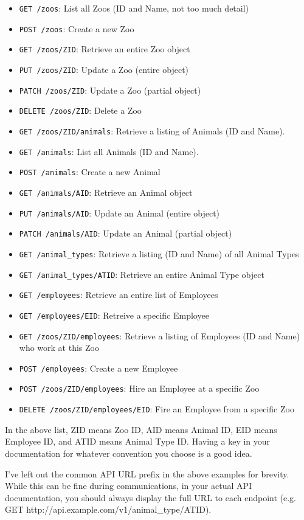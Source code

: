 \documentclass{book}
\begin{document}
\begin{itemize}
\item \texttt{GET /zoos}: List all Zoos (ID and Name, not too much detail)
\item \texttt{POST /zoos}: Create a new Zoo
\item \texttt{GET /zoos/ZID}: Retrieve an entire Zoo object
\item \texttt{PUT /zoos/ZID}: Update a Zoo (entire object)
\item \texttt{PATCH /zoos/ZID}: Update a Zoo (partial object)
\item \texttt{DELETE /zoos/ZID}: Delete a Zoo
\item \texttt{GET /zoos/ZID/animals}: Retrieve a listing of Animals (ID and Name).
\item \texttt{GET /animals}: List all Animals (ID and Name).
\item \texttt{POST /animals}: Create a new Animal
\item \texttt{GET /animals/AID}: Retrieve an Animal object
\item \texttt{PUT /animals/AID}: Update an Animal (entire object)
\item \texttt{PATCH /animals/AID}: Update an Animal (partial object)
\item \texttt{GET /animal\_types}: Retrieve a listing (ID and Name) of all Animal Types
\item \texttt{GET /animal\_types/ATID}: Retrieve an entire Animal Type object
\item \texttt{GET /employees}: Retrieve an entire list of Employees
\item \texttt{GET /employees/EID}: Retreive a specific Employee
\item \texttt{GET /zoos/ZID/employees}: Retrieve a listing of Employees (ID and Name) who work at this Zoo
\item \texttt{POST /employees}: Create a new Employee
\item \texttt{POST /zoos/ZID/employees}: Hire an Employee at a specific Zoo
\item \texttt{DELETE /zoos/ZID/employees/EID}: Fire an Employee from a specific Zoo
\end{itemize}

In the above list, ZID means Zoo ID, AID means Animal ID, EID means Employee ID, and ATID means Animal Type ID. Having a key in your documentation for whatever convention you choose is a good idea.

I've left out the common API URL prefix in the above examples for brevity. While this can be fine during communications, in your actual API documentation, you should always display the full URL to each endpoint (e.g. GET http://api.example.com/v1/animal\_type/ATID).
\end{document}

